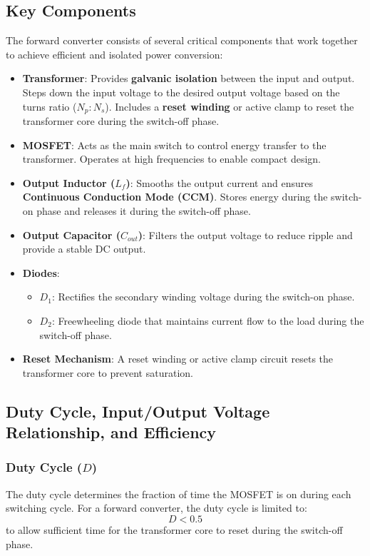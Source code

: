 \subsection{Key Components}

The forward converter consists of several critical components that work together to achieve efficient and isolated power conversion:

\begin{itemize}
    \item \textbf{Transformer}: Provides \textbf{galvanic isolation} between the input and output. Steps down the input voltage to the desired output voltage based on the turns ratio ($ N_p : N_s $). Includes a \textbf{reset winding} or active clamp to reset the transformer core during the switch-off phase.
    \item \textbf{MOSFET}: Acts as the main switch to control energy transfer to the transformer. Operates at high frequencies to enable compact design.
    \item \textbf{Output Inductor ($ L_f $)}: Smooths the output current and ensures \textbf{Continuous Conduction Mode (CCM)}. Stores energy during the switch-on phase and releases it during the switch-off phase.
    \item \textbf{Output Capacitor ($ C_{out} $)}: Filters the output voltage to reduce ripple and provide a stable DC output.
    \item \textbf{Diodes}:
    \begin{itemize}
        \item $ D_1 $: Rectifies the secondary winding voltage during the switch-on phase.
        \item $ D_2 $: Freewheeling diode that maintains current flow to the load during the switch-off phase.
    \end{itemize}
    \item \textbf{Reset Mechanism}: A reset winding or active clamp circuit resets the transformer core to prevent saturation.
\end{itemize}
\subsection{Duty Cycle, Input/Output Voltage Relationship, and Efficiency}

\subsubsection*{Duty Cycle ($ D $)}
The duty cycle determines the fraction of time the MOSFET is on during each switching cycle. For a forward converter, the duty cycle is limited to:
$$
D < 0.5
$$
to allow sufficient time for the transformer core to reset during the switch-off phase.

